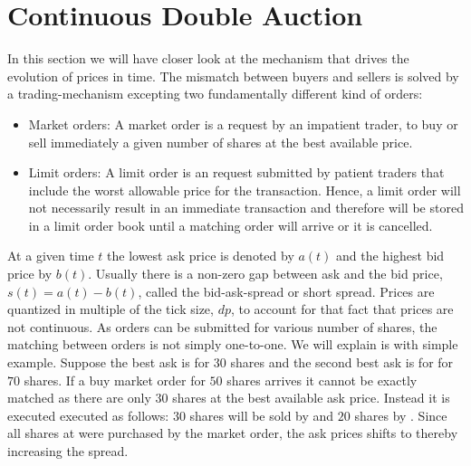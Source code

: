 \documentclass[11pt, a4paper]{thesis}  %
\begin{document}
%
%

\chapter{Continuous Double Auction}
\label{chapter:double_auction}
In this section we will have closer look at the mechanism that drives the evolution of prices in time.
The mismatch between buyers and sellers is solved by a trading-mechanism excepting two fundamentally different kind of orders:
%
\begin{itemize}
	\item Market orders: A market order is a request by an impatient trader, 
	to buy or sell immediately a given number of shares at the best available price.
 
	\item Limit orders: A limit order is an request submitted by patient traders that include the 
	worst allowable price for the transaction. Hence, a limit order will not necessarily result in an 
	immediate transaction and therefore will be stored in a limit order book until a 
	matching order will arrive or it is cancelled. 
\end{itemize}
%
At a given time $t$ the lowest ask price is denoted by $a(t)$ and the highest bid price by $b(t)$. Usually there is a non-zero gap between ask and the bid price, $s(t)=a(t) - b(t)$, called the bid-ask-spread or short spread. Prices are quantized in multiple of the tick size, $dp$, to account for that fact that prices are not continuous. As orders can be submitted for various number of shares, the matching between orders is not simply one-to-one. We will explain is with simple example. Suppose the best ask is  for 30 shares and the second best ask is for  for $70$ shares. If a buy market order for $50$ shares arrives it cannot be exactly matched as there are only $30$ shares at the best available ask price. Instead it is executed executed as follows: $30$ shares will be sold by  and $20$ shares by . Since all shares at  were purchased by the market order, the ask prices shifts to  thereby increasing the spread. 
\end{document}
